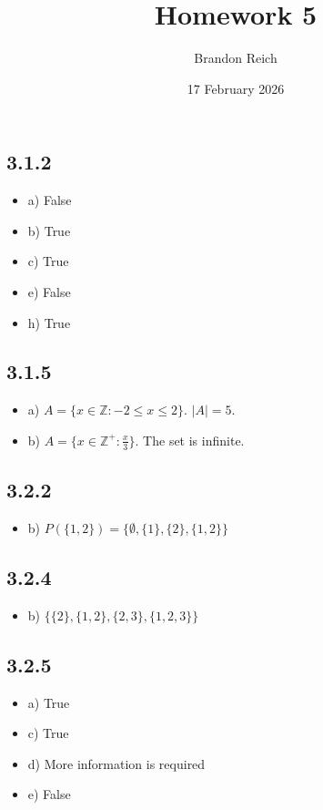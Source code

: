 \documentclass{article}
\title{Homework 5}
\author{Brandon Reich}
\date{17 February 2026}
\newcommand{\Z}{\mathbb{Z}}
\begin{document}
\maketitle

\subsection*{3.1.2}
\begin{itemize}
    \item a) False
    \item b) True
    \item c) True
    \item e) False
    \item h) True
\end{itemize}

\subsection*{3.1.5}
\begin{itemize}
    \item a) $A = \{ x \in \Z : -2 \le x \le 2 \}$. $|A| = 5$.
    \item b) $A = \{ x \in \Z^+ : \frac{x}{3} \}$. The set is infinite.
\end{itemize}

\subsection*{3.2.2}
\begin{itemize}
    \item b) $P(\{1,2\}) = \{\emptyset, \{1\},\{2\},\{1,2\}\}$
\end{itemize}

\subsection*{3.2.4}
\begin{itemize}
    \item b) $\{\{2\},\{1,2\},\{2,3\},\{1,2,3\}\}$
\end{itemize}

\subsection*{3.2.5}
\begin{itemize}
    \item a) True
    \item c) True
    \item d) More information is required
    \item e) False
\end{itemize}
\end{document}
